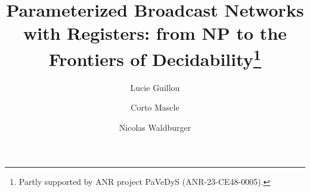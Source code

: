 \documentclass[runningheads]{llncs}
\begin{document}
\title{Parameterized Broadcast Networks with Registers: from NP to the Frontiers of Decidability\thanks{\footnotesize{Partly supported by ANR project PaVeDyS (ANR-23-CE48-0005).}}}





\author{Lucie Guillou \and Corto Mascle \and Nicolas Waldburger}





	\maketitle 
	


\newcommand{\cortoin}[1]{\todo[color=blue!20,inline]{\small #1}}
\newcommand{\corto}[1]{\todo[color=blue!20]{\small #1}}

\newcommand{\nicoin}[1]{\todo[color=red!20,inline]{\small #1}}
\newcommand{\nico}[1]{\todo[color=red!20]{\small #1}}

\newcommand{\luin}[1]{\todo[color=teal!20,inline]{\small #1}}
\newcommand{\lu}[1]{\todo[color=teal!20]{\small #1}}
\end{document}
